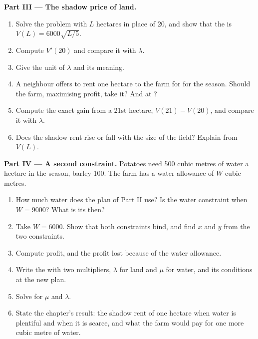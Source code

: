 \begin{problem}
\medskip\noindent\textbf{Part III --- The shadow price of land.}
\begin{enumerate}[resume]
  \item Solve the problem with $L$ hectares in place of 20, and show that the  is $V(L) = 6000\sqrt{L/5}$.
  \item Compute $V'(20)$ and compare it with $\lambda$.
  \item Give the unit of $\lambda$ and its meaning.
  \item A neighbour offers to rent one hectare to the farm for  for the season. Should the farm, maximising profit, take it? And at ?
  \item Compute the exact gain from a 21st hectare, $V(21) - V(20)$, and compare it with $\lambda$.
  \item Does the shadow rent rise or fall with the size of the field? Explain from $V(L)$.
\end{enumerate}

\medskip\noindent\textbf{Part IV --- A second constraint.}
Potatoes need 500 cubic metres of water a hectare in the season, barley
100. The farm has a water allowance of $W$ cubic metres.
\begin{enumerate}[resume]
  \item How much water does the plan of Part II use? Is the water constraint  when $W = 9000$? What is its  then?
  \item Take $W = 6000$. Show that both constraints bind, and find $x$ and $y$ from the two constraints.
  \item Compute profit, and the profit lost because of the water allowance.
  \item Write the  with two multipliers, $\lambda$ for land and $\mu$ for water, and its conditions at the new plan.
  \item Solve for $\mu$ and $\lambda$.
  \item State the chapter's result: the shadow rent of one hectare when water is plentiful and when it is scarce, and what the farm would pay for one more cubic metre of water.
\end{enumerate}
\end{problem}
